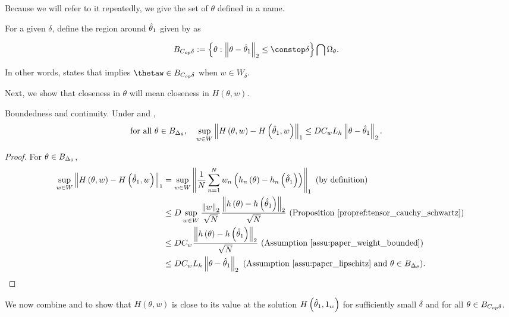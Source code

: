 %
Because we will refer to it repeatedly, we give the set of $\theta$
defined in  a name.
\begin{defn}
For a given $\delta$, define the region around $\hat{\theta}_{1}$ given
by  as

\begin{align*}
\thetadeltaball & :=\left\{ \theta:\norm{\theta-\thetaone}_{2}\le\constop\delta\right\} \bigcap\Omega_{\theta}.
\end{align*}
\end{defn}
%
In other words,  states that 
implies $\thetaw\in\thetadeltaball$ when $w\in W_{\delta}$.

Next, we show that closeness in $\theta$ will mean closeness in $H\left(\theta,w\right)$.
\begin{lem}
\label{lem:bounded_continuous} Boundedness and continuity. Under
\paperallcoreassum and ,
\begin{align*}
\textrm{for all }\theta\in B_{\Delta_{\theta}},\quad\sup_{w\in W}\left\Vert H\left(\theta,w\right)-H\left(\hat{\theta}_{1},w\right)\right\Vert_{1} & \le DC_{w}L_{h}\left\Vert \theta-\hat{\theta}_{1}\right\Vert_{2}.
\end{align*}
\end{lem}
\begin{proof}
For $\theta\in B_{\Delta_{\theta}}$,
\begin{align*}
\sup_{w\in W}\left\Vert H\left(\theta,w\right)-H\left(\hat{\theta}_{1},w\right)\right\Vert_{1} & =\sup_{w\in W}\left\Vert \frac{1}{N}\sum_{n=1}^{N}w_{n}\left(h_{n}\left(\theta\right)-h_{n}\left(\hat{\theta}_{1}\right)\right)\right\Vert_{1}\textrm{ (by definition)}\\
 & \le D\sup_{w\in W}\frac{\left\Vert w\right\Vert_{2}}{\sqrt{N}}\frac{\left\Vert h\left(\theta\right)-h\left(\hat{\theta}_{1}\right)\right\Vert_{2}}{\sqrt{N}}\textrm{ (Proposition \ref{propref:tensor_cauchy_schwartz})}\\
 & \le DC_{w}\frac{\left\Vert h\left(\theta\right)-h\left(\hat{\theta}_{1}\right)\right\Vert_{2}}{\sqrt{N}}\textrm{ (Assumption \ref{assu:paper_weight_bounded})}\\
 & \le DC_{w}L_{h}\left\Vert \theta-\hat{\theta}_{1}\right\Vert_{2}\textrm{ (Assumption \ref{assu:paper_lipschitz} and }\theta\in B_{\Delta_{\theta}}\textrm{)}.
\end{align*}
\end{proof}
%
We now combine  and 
to show that $H\left(\theta,w\right)$ is close to its value at the
solution $H\left(\hat{\theta}_{1},1_{w}\right)$ for sufficiently small
$\delta$ and for all $\theta\in B_{C_{op}\delta}$.
%


